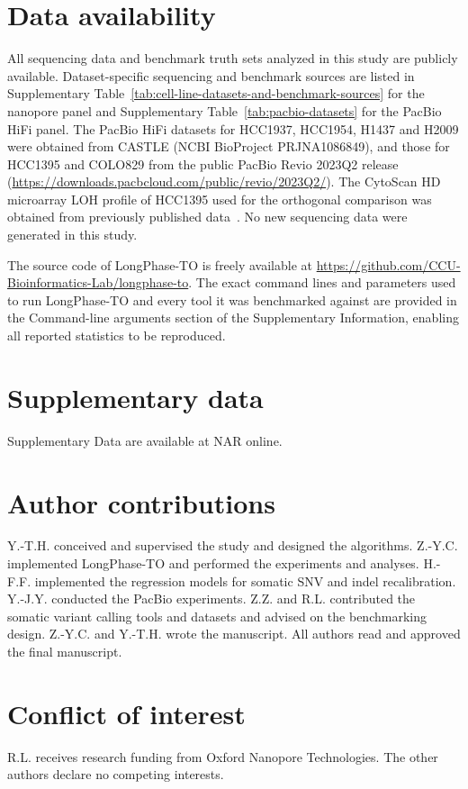 \documentclass[unnumsec,webpdf,contemporary,large]{oup-authoring-template}
\begin{document}
\section{Data availability}
All sequencing data and benchmark truth sets analyzed in this study are publicly available. Dataset-specific sequencing and benchmark sources are listed in Supplementary Table~\ref{tab:cell-line-datasets-and-benchmark-sources} for the nanopore panel and Supplementary Table~\ref{tab:pacbio-datasets} for the PacBio HiFi panel. The PacBio HiFi datasets for HCC1937, HCC1954, H1437 and H2009 were obtained from CASTLE (NCBI BioProject PRJNA1086849), and those for HCC1395 and COLO829 from the public PacBio Revio 2023Q2 release (\url{https://downloads.pacbcloud.com/public/revio/2023Q2/}). The CytoScan HD microarray LOH profile of HCC1395 used for the orthogonal comparison was obtained from previously published data~\cite{fang2021}. No new sequencing data were generated in this study.

The source code of LongPhase-TO is freely available at \href{https://github.com/CCU-Bioinformatics-Lab/longphase-to}{https://github.com/CCU-Bioinformatics-Lab/longphase-to}. The exact command lines and parameters used to run LongPhase-TO and every tool it was benchmarked against are provided in the Command-line arguments section of the Supplementary Information, enabling all reported statistics to be reproduced.

\section{Supplementary data}
Supplementary Data are available at NAR online.

\section{Author contributions}
Y.-T.H. conceived and supervised the study and designed the algorithms. Z.-Y.C. implemented LongPhase-TO and performed the experiments and analyses. H.-F.F. implemented the regression models for somatic SNV and indel recalibration. Y.-J.Y. conducted the PacBio experiments. Z.Z. and R.L. contributed the somatic variant calling tools and datasets and advised on the benchmarking design. Z.-Y.C. and Y.-T.H. wrote the manuscript. All authors read and approved the final manuscript.

\section{Conflict of interest}
R.L. receives research funding from Oxford Nanopore Technologies. The other authors declare no competing interests.
\end{document}
